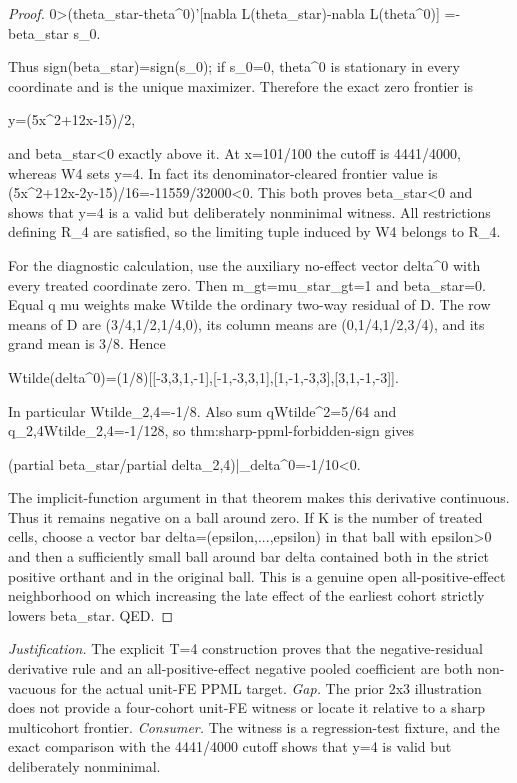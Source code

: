 \documentclass{article}
\begin{document}
\begin{proof}
  0>(theta_star-theta^0)'[nabla L(theta_star)-nabla L(theta^0)]
   =-beta_star s_0.

Thus sign(beta_star)=sign(s_0); if s_0=0, theta^0 is stationary in every coordinate and is the unique maximizer. Therefore the exact zero frontier is

  y=(5x^2+12x-15)/2,

and beta_star<0 exactly above it. At x=101/100 the cutoff is 4441/4000, whereas W4 sets y=4. In fact its denominator-cleared frontier value is (5x^2+12x-2y-15)/16=-11559/32000<0. This both proves beta_star<0 and shows that y=4 is a valid but deliberately nonminimal witness. All restrictions defining R_4 are satisfied, so the limiting tuple induced by W4 belongs to R_4.

For the diagnostic calculation, use the auxiliary no-effect vector delta^0 with every treated coordinate zero. Then m_{gt}=mu_star_{gt}=1 and beta_star=0. Equal q mu weights make Wtilde the ordinary two-way residual of D. The row means of D are (3/4,1/2,1/4,0), its column means are (0,1/4,1/2,3/4), and its grand mean is 3/8. Hence

  Wtilde(delta^0)=(1/8)[[-3,3,1,-1],[-1,-3,3,1],[1,-1,-3,3],[3,1,-1,-3]].

In particular Wtilde_{2,4}=-1/8. Also sum qWtilde^2=5/64 and q_{2,4}Wtilde_{2,4}=-1/128, so thm:sharp-ppml-forbidden-sign gives

  (partial beta_star/partial delta_{2,4})|_{delta^0}=-1/10<0.

The implicit-function argument in that theorem makes this derivative continuous. Thus it remains negative on a ball around zero. If K is the number of treated cells, choose a vector bar delta=(epsilon,...,epsilon) in that ball with epsilon>0 and then a sufficiently small ball around bar delta contained both in the strict positive orthant and in the original ball. This is a genuine open all-positive-effect neighborhood on which increasing the late effect of the earliest cohort strictly lowers beta_star. QED.
\end{proof}
\par\smallskip\noindent \textit{Justification.} The explicit T=4 construction proves that the negative-residual derivative rule and an all-positive-effect negative pooled coefficient are both non-vacuous for the actual unit-FE PPML target. \textit{Gap.} The prior 2x3 illustration does not provide a four-cohort unit-FE witness or locate it relative to a sharp multicohort frontier. \textit{Consumer.} The witness is a regression-test fixture, and the exact comparison with the 4441/4000 cutoff shows that y=4 is valid but deliberately nonminimal.
\end{document}
